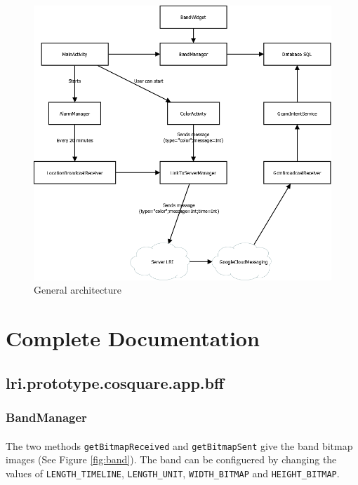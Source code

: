 \documentclass[12pt]{article}
\begin{document}
\begin{figure}[ht]
	\centering
		\includegraphics[width=16cm]{graphs/global.png}
	\caption{General architecture}
	\label{fig:global}
\end{figure}

\newpage
\section{Complete Documentation}
\subsection{lri.prototype.cosquare.app.bff}
\subsubsection{BandManager}
\paragraph{}The two methods \verb?getBitmapReceived? and \verb?getBitmapSent? give the band bitmap images (See Figure \ref{fig:band}). The band can be configuered by changing the values of \verb?LENGTH_TIMELINE?, \verb?LENGTH_UNIT?, \verb?WIDTH_BITMAP? and \verb?HEIGHT_BITMAP?.
\end{document}
